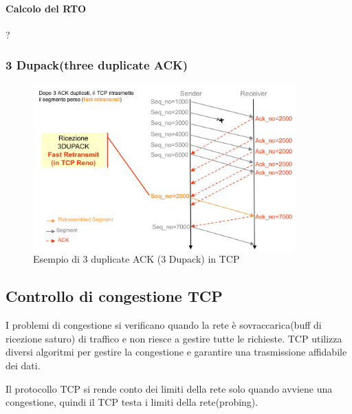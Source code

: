 \paragraph{Calcolo del RTO}

?

\newpage
\subsubsection{3 Dupack(three duplicate ACK)}
\begin{figure}[h!]
    \centering
    \includegraphics[width=0.9\textwidth]{images/3dupack.png}
    \caption{Esempio di 3 duplicate ACK (3 Dupack) in TCP}
    \label{fig:3dupack}
\end{figure}
\subsection{Controllo di congestione TCP}

I problemi di congestione si verificano quando la rete è sovraccarica(buff di ricezione saturo) di traffico e non riesce a gestire tutte le richieste. TCP utilizza diversi algoritmi per gestire la congestione e garantire una trasmissione affidabile dei dati.

Il protocollo TCP si rende conto dei limiti della rete solo quando avviene una congestione, quindi il TCP testa i limiti della rete(probing).

